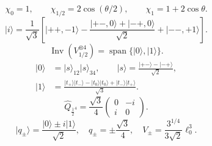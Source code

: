 \documentclass{article}
\newcommand{\ket}[1]{\lvert #1\rangle}
\newcommand{\Inv}{\operatorname{Inv}}
\begin{document}
\begin{equation}
\chi_0=1,\qquad\chi_{1/2}=2\cos(\theta/2),\qquad\chi_1=1+2\cos\theta.
\tag{L3}
\end{equation}
\begin{equation}
\ket{i}=\frac1{\sqrt3}\left[\ket{++,-1}-\frac{\ket{+-,0}+\ket{-+,0}}{\sqrt2}+\ket{--,+1}\right].
\tag{L4}
\end{equation}
\begin{equation}
\Inv(V_{1/2}^{\otimes4})=\operatorname{span}\{\ket0,\ket1\}.
\tag{L5}
\end{equation}
\begin{equation}
\begin{aligned}
\ket0&=\ket{s}_{12}\ket{s}_{34},\qquad\ket{s}=\frac{\ket{+-}-\ket{-+}}{\sqrt2},\\
\ket1&=\frac{\ket{t_+}\ket{t_-}-\ket{t_0}\ket{t_0}+\ket{t_-}\ket{t_+}}{\sqrt3}.
\end{aligned}
\tag{L6}
\end{equation}
\begin{equation}
\hat Q_{\frac12^4}=\frac{\sqrt3}{4}\begin{pmatrix}0&-i\\i&0\end{pmatrix}.
\tag{L7}
\end{equation}
\begin{equation}
\ket{q_\pm}=\frac{\ket0\pm i\ket1}{\sqrt2},\quad q_\pm=\pm\frac{\sqrt3}{4},\quad V_\pm=\frac{3^{1/4}}{3\sqrt2}\ell_0^3.
\tag{L8}
\end{equation}
\end{document}
